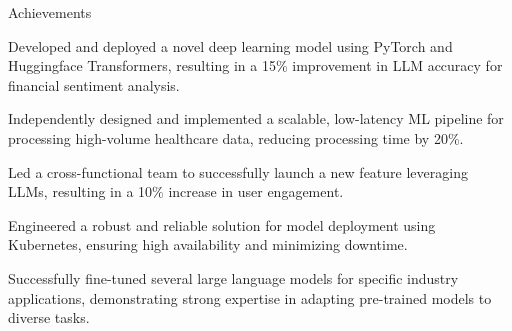 \documentclass{resume} %
\begin{document}
    \begin{rSection}{Achievements}
        \begin{rSubsection}{}{}{}
                            \item Developed and deployed a novel deep learning model using PyTorch and Huggingface Transformers, resulting in a 15\% improvement in LLM accuracy for financial sentiment analysis.
                            \item Independently designed and implemented a scalable, low-latency ML pipeline for processing high-volume healthcare data, reducing processing time by 20\%.
                            \item Led a cross-functional team to successfully launch a new feature leveraging LLMs, resulting in a 10\% increase in user engagement.
                            \item Engineered a robust and reliable solution for model deployment using Kubernetes, ensuring high availability and minimizing downtime.
                            \item Successfully fine-tuned several large language models for specific industry applications, demonstrating strong expertise in adapting pre-trained models to diverse tasks.
                    \end{rSubsection}
    \end{rSection}
\end{document}
